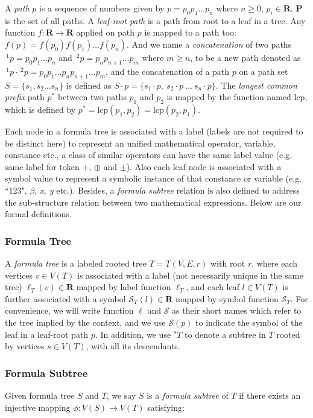 A \textit{path} $p$ is a sequence of numbers given by $p = p_0 p_1 \ldots p_n$ where $n\ge0$, $p_i \in \mathbf{R}$. $\mathbf{P}$ is the set of all paths.
A \textit{leaf-root path} is a path from root to a leaf in a tree.
Any function $f: \mathbf{R} \rightarrow \mathbf{R}$ applied on path $p$ is mapped to a path too: $f(p)=f(p_0)f(p_1) \ldots f(p_n)$.
And we name  a \textit{concatenation} of two paths $\,^1p = p_0p_1 \ldots p_n$ and $\,^2p = p_np_{n+1} \ldots p_m$ where $m \ge n$, to be a new path denoted as $\,^1p \cdot \,^2p = p_0p_1 \ldots p_n p_{n+1} \ldots p_m$,
and the concatenation of a path $p$ on a path set $S = \{ s_1, s_2 \ldots s_n \}$ is defined as $S \cdot p = \{ s_1\cdot p,\  s_2\cdot p \ \ldots \ s_n\cdot p \}$.
The \textit{longest common prefix} path $p^*$ between two paths $p_1$ and $p_2$ is mapped by the function named $\mathrm{lcp}$, which is defined by $p^* = \mathrm{lcp}(p_1, p_2) = \mathrm{lcp}(p_2, p_1)$.

Each node in a formula tree is associated with a label (labels are not required to be distinct here) to represent an unified mathematical operator, variable, constance etc., 
 a class of similar operators can have the same label value (e.g. same label for token $+$, $\oplus$ and $\pm$).
Also each leaf node is associated with a symbol value to represent a symbolic instance of that constance or variable (e.g. ``123", $\beta$, \textit{x, y} etc.). 
Besides, a \textit{formula subtree} relation is also defined to address the sub-structure relation between two mathematical expressions.
Below are our formal definitions.

\subsubsection{Formula Tree}
A \textit{formula tree} is a labeled rooted tree $T = T(V,E,r)$ with root $r$, where each vertices $v \in V(T)$ is associated with a label (not necessarily unique in the same tree) $\ell_T(v) \in \mathbf{R}$ mapped by label function $\ell_T$,
and each leaf $l \in V(T)$ is further associated with a symbol $\mathcal{S}_T(l) \in \mathbf{R}$ mapped by symbol function $\mathcal{S}_T$. 
For convenience, we will write function $\ell$ and $\mathcal{S}$ as their short names which refer to the tree implied by the context, and we use $\mathcal{S}(p)$ to indicate the symbol of the leaf in a leaf-root path $p$.
In addition, we use $^s T$ to denote a subtree in $T$ rooted by vertices $s \in V(T)$, with all its descendants.

\subsubsection{Formula Subtree}
\label{frmlsubtreeDef}
Given formula tree $S$ and $T$, we say $S$ is a \textit{formula subtree} of $T$ if there exists an injective mapping $\phi: V(S) \rightarrow V(T)$ satisfying:

